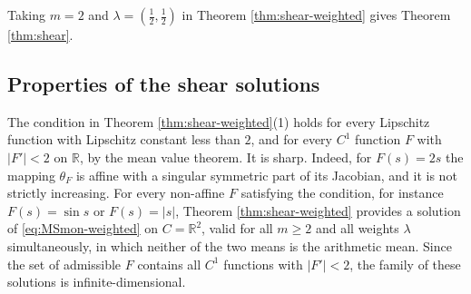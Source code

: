 \documentclass[a4paper, reqno, 11pt]{amsart}
\theoremstyle{definition}
\begin{document}
Taking $m=2$ and $\lambda=(\tfrac{1}{2},\tfrac{1}{2})$ in Theorem \ref{thm:shear-weighted} gives Theorem \ref{thm:shear}.

\subsection{Properties of the shear solutions}

The condition in Theorem \ref{thm:shear-weighted}(1) holds for every Lipschitz function with Lipschitz constant less than $2$, and for every $C^1$ function $F$ with $|F'| < 2$ on $\mathbb{R}$, by the mean value theorem.
It is sharp. 
Indeed, for $F(s) = 2s$ the mapping $\theta_F$ is affine with a singular symmetric part of its Jacobian, and it is not strictly increasing.
For every non-affine $F$ satisfying the condition, for instance $F(s) = \sin s$ or $F(s) = |s|$, Theorem \ref{thm:shear-weighted} provides a solution of \eqref{eq:MSmon-weighted} on $C = \mathbb{R}^2$, valid for all $m \ge  2$ and all weights $\lambda$ simultaneously, in which neither of the two means is the arithmetic mean.
Since the set of admissible $F$ contains all $C^1$ functions with $|F'| < 2$, the family of these solutions is infinite-dimensional.
\end{document}

